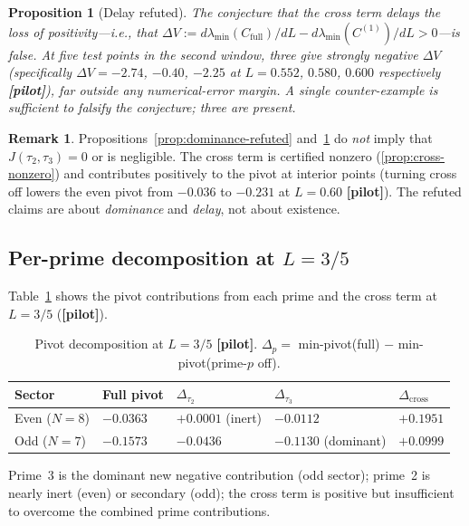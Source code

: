 \documentclass[12pt,a4paper]{amsart}
\theoremstyle{plain}
\newtheorem{proposition}[theorem]{Proposition}
\theoremstyle{definition}
\newtheorem{remark}[theorem]{Remark}
\newcommand{\Jcross}{J(\tau_2,\tau_3)}
\newcommand{\pilot}{\textbf{[pilot]}}
\begin{document}
\begin{proposition}[Delay refuted]
\label{prop:delay-refuted}
The conjecture that the cross term \emph{delays} the loss of positivity---i.e.,
that $\Delta V := d\lambda_{\min}(C_{\mathrm{full}})/dL - d\lambda_{\min}(C^{(1)})/dL > 0$---is
false.  At five test points in the second window, three give strongly negative
$\Delta V$ (specifically $\Delta V = -2.74$, $-0.40$, $-2.25$ at $L = 0.552$,
$0.580$, $0.600$ respectively \pilot), far outside any numerical-error margin.
A single counter-example is sufficient to falsify the conjecture; three are
present.
\end{proposition}

\begin{remark}
Propositions~\ref{prop:dominance-refuted} and~\ref{prop:delay-refuted} do
\emph{not} imply that $\Jcross = 0$ or is negligible.  The cross term is
certified nonzero (\cref{prop:cross-nonzero}) and contributes positively to
the pivot at interior points (turning cross off lowers the even pivot from
$-0.036$ to $-0.231$ at $L=0.60$ \pilot).  The refuted claims are about
\emph{dominance} and \emph{delay}, not about existence.
\end{remark}

\subsection{Per-prime decomposition at \texorpdfstring{$L=3/5$}{L=3/5}}

Table~\ref{tab:per-prime} shows the pivot contributions from each prime and
the cross term at $L=3/5$ (\pilot).

\begin{table}[h]
\centering
\caption{Pivot decomposition at $L=3/5$ \pilot.
         $\Delta_p = $ min-pivot(full) $-$ min-pivot(prime-$p$ off).}
\label{tab:per-prime}
\begin{tabular}{@{}lllll@{}}
\toprule
Sector & Full pivot & $\Delta_{\tau_2}$ & $\Delta_{\tau_3}$ & $\Delta_{\mathrm{cross}}$ \\
\midrule
Even ($N=8$) & $-0.0363$ & $+0.0001$ (inert) & $-0.0112$ & $+0.1951$ \\
Odd  ($N=7$) & $-0.1573$ & $-0.0436$         & $-0.1130$ (dominant) & $+0.0999$ \\
\bottomrule
\end{tabular}
\end{table}

Prime~3 is the dominant new negative contribution (odd sector); prime~2 is
nearly inert (even) or secondary (odd); the cross term is positive but
insufficient to overcome the combined prime contributions.
\end{document}

